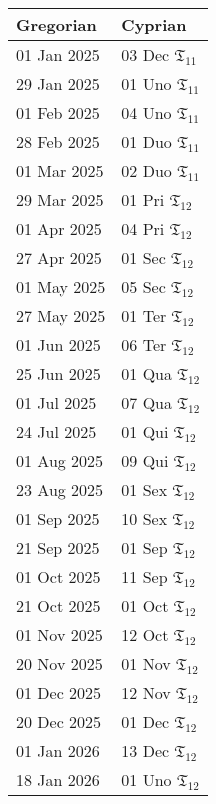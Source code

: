 \begin{table}
    \begin{tabular}{|l|l|}
        \hline
        \textbf{Gregorian} & \textbf{Cyprian} \\
        \hline
        01 Jan 2025 & 03 Dec $\mathfrak{T}_{11}$ \\
        29 Jan 2025 & 01 Uno $\mathfrak{T}_{11}$ \\
        01 Feb 2025 & 04 Uno $\mathfrak{T}_{11}$ \\
        28 Feb 2025 & 01 Duo $\mathfrak{T}_{11}$ \\
        01 Mar 2025 & 02 Duo $\mathfrak{T}_{11}$ \\
        29 Mar 2025 & 01 Pri $\mathfrak{T}_{12}$ \\
        01 Apr 2025 & 04 Pri $\mathfrak{T}_{12}$ \\
        27 Apr 2025 & 01 Sec $\mathfrak{T}_{12}$ \\
        01 May 2025 & 05 Sec $\mathfrak{T}_{12}$ \\
        27 May 2025 & 01 Ter $\mathfrak{T}_{12}$ \\
        01 Jun 2025 & 06 Ter $\mathfrak{T}_{12}$ \\
        25 Jun 2025 & 01 Qua $\mathfrak{T}_{12}$ \\
        01 Jul 2025 & 07 Qua $\mathfrak{T}_{12}$ \\
        24 Jul 2025 & 01 Qui $\mathfrak{T}_{12}$ \\
        01 Aug 2025 & 09 Qui $\mathfrak{T}_{12}$ \\
        23 Aug 2025 & 01 Sex $\mathfrak{T}_{12}$ \\
        01 Sep 2025 & 10 Sex $\mathfrak{T}_{12}$ \\
        21 Sep 2025 & 01 Sep $\mathfrak{T}_{12}$ \\
        01 Oct 2025 & 11 Sep $\mathfrak{T}_{12}$ \\
        21 Oct 2025 & 01 Oct $\mathfrak{T}_{12}$ \\
        01 Nov 2025 & 12 Oct $\mathfrak{T}_{12}$ \\
        20 Nov 2025 & 01 Nov $\mathfrak{T}_{12}$ \\
        01 Dec 2025 & 12 Nov $\mathfrak{T}_{12}$ \\
        20 Dec 2025 & 01 Dec $\mathfrak{T}_{12}$ \\
        01 Jan 2026 & 13 Dec $\mathfrak{T}_{12}$ \\
        18 Jan 2026 & 01 Uno $\mathfrak{T}_{12}$ \\

\end{tabular}
\end{table}
